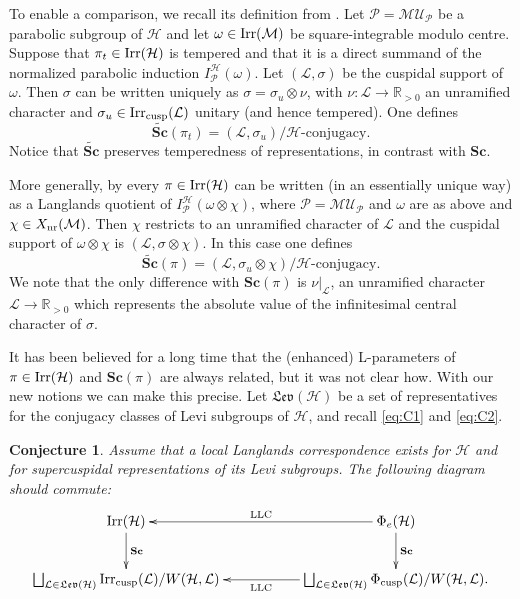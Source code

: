 \documentclass[11pt]{amsart}
\newtheorem{conj}[thm]{Conjecture}
\theoremstyle{definition}
\newcommand{\mb}{\mathbf}
\newcommand{\mc}{\mathcal}
\newcommand{\mf}{\mathfrak}
\newcommand{\R}{\mathbb R}
\def\Irr{{\rm Irr}}
\def\cL{{\mathcal L}}
\def\cH{{\mathcal H}}
\def\nr{{\rm nr}}
\def\LLC{{\rm LLC}}
\def\cusp{{\rm cusp}}
\begin{document}
To enable a comparison, we recall its definition from \cite[\S 2.5]{ABPS7}.
Let $\mc P = \mc M \mc{U}_{\mc P}$ be a parabolic subgroup of $\cH$ and let 
$\omega \in \Irr (\mc M)$ be square-integrable modulo centre.
Suppose that $\pi_t \in \Irr (\cH)$ is tempered and that it is a direct
summand of the normalized parabolic induction $I_{\mc P}^\cH (\omega)$.
Let $(\cL,\sigma)$ be the cuspidal support of $\omega$. Then $\sigma$ can
be written uniquely as $\sigma = \sigma_u \otimes \nu$, with $\nu : \cL
\to \R_{>0}$ an unramified character and $\sigma_u \in \Irr_\cusp (\cL)$
unitary (and hence tempered). One defines
\[
\widetilde{\mb{Sc}} (\pi_t) = (\cL,\sigma_u) / \cH \text{-conjugacy} .
\]
Notice that $\widetilde{\mb{Sc}}$ preserves temperedness of representations,
in contrast with $\mb{Sc}$.

More generally, by \cite[Theorem 2.15]{SolPCH} every $\pi \in \Irr (\cH)$
can be written (in an essentially unique way) as a Langlands quotient of
$I_{\mc P}^\cH (\omega \otimes \chi)$, where $\mc P = \mc M \mc U_{\mc P}$
and $\omega$ are as above and $\chi \in X_\nr (\mc M)$. Then 
$\chi$ restricts to an unramified character of $\cL$ and the cuspidal 
support of  $\omega \otimes \chi$ is $(\cL,\sigma \otimes \chi)$.
In this case one defines
\[
\widetilde{\mb{Sc}} (\pi) = (\cL,\sigma_u \otimes \chi) / \cH \text{-conjugacy}. 
\]
We note that the only difference with $\mb{Sc}(\pi)$ is $\nu |_\cL$, an 
unramified character $\cL \to \R_{>0}$ which represents the absolute value 
of the infinitesimal central character of $\sigma$.

It has been believed for a long time that the (enhanced) L-parameters of $\pi \in
\Irr (\cH)$ and $\mathbf{Sc}(\pi)$ are always related, but it was not clear how.
With our new notions we can make this precise. Let $\mf{Lev}(\cH)$ be a set of
representatives for the conjugacy classes of Levi subgroups of $\cH$, and
recall \eqref{eq:C1} and \eqref{eq:C2}. 

\begin{conj}\label{conj:7.13}
Assume that a local Langlands correspondence exists for $\cH$ and for supercuspidal
representations of its Levi subgroups. The following diagram should commute:
\[
\xymatrix{
\Irr (\cH) \ar@{<-}[rr]^{\LLC} \ar[d]^{\mathbf{Sc}} & & \Phi_e (\cH) \ar[d]^{\mathbf{Sc}} \\
\bigsqcup_{\cL \in \mf{Lev}(\cH)} \Irr_\cusp (\cL) / W(\cH,\cL) \ar@{<-}[rr]_{\LLC} & & 
\bigsqcup_{\cL \in \mf{Lev}(\cH)} \Phi_\cusp (\cL) / W(\cH,\cL) .
}
\]
\end{conj}
\end{document}

